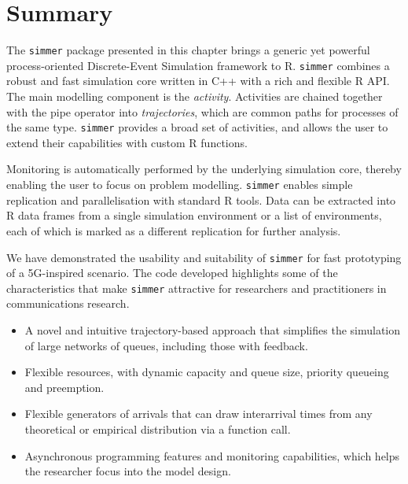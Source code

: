 \documentclass[twoside,nohyper]{tufte-book}
\providecommand{\tightlist}{%
  \setlength{\itemsep}{0pt}\setlength{\parskip}{0pt}}
\begin{document}
\hypertarget{summary-5}{%
\section{Summary}\label{summary-5}}

The \texttt{simmer} package presented in this chapter\cite[0pt]{contrib-08a} brings a generic yet powerful process-oriented Discrete-Event Simulation framework to R. \texttt{simmer} combines a robust and fast simulation core written in C++ with a rich and flexible R API. The main modelling component is the \emph{activity}. Activities are chained together with the pipe operator into \emph{trajectories}, which are common paths for processes of the same type. \texttt{simmer} provides a broad set of activities, and allows the user to extend their capabilities with custom R functions.

Monitoring is automatically performed by the underlying simulation core, thereby enabling the user to focus on problem modelling. \texttt{simmer} enables simple replication and parallelisation with standard R tools. Data can be extracted into R data frames from a single simulation environment or a list of environments, each of which is marked as a different replication for further analysis.

We have demonstrated\cite[0pt]{contrib-08b} the usability and suitability of \texttt{simmer} for fast prototyping of a 5G-inspired scenario. The code developed highlights some of the characteristics that make \texttt{simmer} attractive for researchers and practitioners in communications research.

\begin{itemize}
\tightlist
\item
  A novel and intuitive trajectory-based approach that simplifies the simulation of large networks of queues, including those with feedback.
\item
  Flexible resources, with dynamic capacity and queue size, priority queueing and preemption.
\item
  Flexible generators of arrivals that can draw interarrival times from any theoretical or empirical distribution via a function call.
\item
  Asynchronous programming features and monitoring capabilities, which helps the researcher focus into the model design.
\end{itemize}
\end{document}
